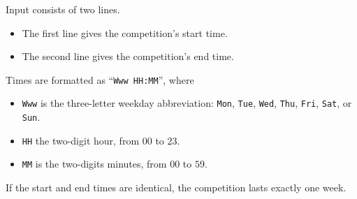 
  Input consists of two lines.

  \begin{itemize}
    \item
      The first line gives the competition's start time. 
    \item
      The second line gives the competition's end time.
  \end{itemize}

  Times are formatted as ``\texttt{Www HH:MM}'', where
  \begin{itemize}
    \item \texttt{Www} is the three-letter weekday abbreviation:
      \texttt{Mon}, 
      \texttt{Tue}, 
      \texttt{Wed}, 
      \texttt{Thu}, 
      \texttt{Fri}, 
      \texttt{Sat}, or 
      \texttt{Sun}. 
    \item
      \texttt{HH} the two-digit hour, from $00$ to $23$.
    \item \texttt{MM} is the two-digits minutes, from $00$ to $59$.
  \end{itemize}

  If the start and end times are identical, the competition lasts exactly one week.
